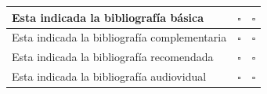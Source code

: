 \documentclass[a4pa<per,12pt,spanish]{article}
\begin{document}
\begin{center}
\begin{tabular}[H]{|l|l|l|}
  Esta indicada la bibliografía básica &{\Large $\square$} &{\Large $\square$} \\  \hline
  Esta indicada la bibliografía complementaria &{\Large $\square$} &{\Large $\square$} \\ \hline
  Esta indicada la bibliografía recomendada &{\Large $\square$} &{\Large $\square$}  \\ \hline 
  Esta indicada la bibliografía audiovidual &{\Large $\square$} &{\Large $\square$} \\ \hline \hline
  
\end{tabular}
\end{center}
\end{document}
